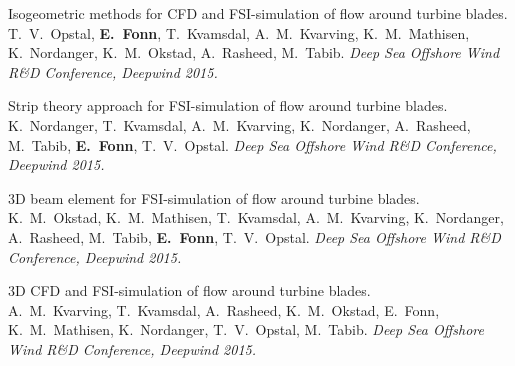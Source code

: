 \documentclass[line,margin]{res}
\begin{document}
\begin{resume}
Isogeometric methods for CFD and FSI-simulation of flow around turbine blades. \\
T.~V.~Opstal, {\bf E.~Fonn}, T.~Kvamsdal, A.~M.~Kvarving, K.~M.~Mathisen,
K.~Nordanger, K.~M.~Okstad, A.~Rasheed, M.~Tabib.
{\em {} Deep Sea Offshore Wind R\&D Conference, Deepwind 2015.}

Strip theory approach for FSI-simulation of flow around turbine blades. \\
K.~Nordanger, T.~Kvamsdal, A.~M.~Kvarving, K.~Nordanger, A.~Rasheed, M.~Tabib,
{\bf E.~Fonn}, T.~V.~Opstal.
{\em {} Deep Sea Offshore Wind R\&D Conference, Deepwind 2015.}

3D beam element for FSI-simulation of flow around turbine blades. \\
K.~M.~Okstad, K.~M.~Mathisen, T.~Kvamsdal, A.~M.~Kvarving, K.~Nordanger,
A.~Rasheed, M.~Tabib, {\bf E.~Fonn}, T.~V.~Opstal.
{\em {} Deep Sea Offshore Wind R\&D Conference, Deepwind 2015.}

3D CFD and FSI-simulation of flow around turbine blades. \\
A.~M.~Kvarving, T.~Kvamsdal, A.~Rasheed, K.~M.~Okstad, E.~Fonn, K.~M.~Mathisen,
K.~Nordanger, T.~V.~Opstal, M.~Tabib.
{\em {} Deep Sea Offshore Wind R\&D Conference, Deepwind 2015.}


\end{resume}
\end{document}
